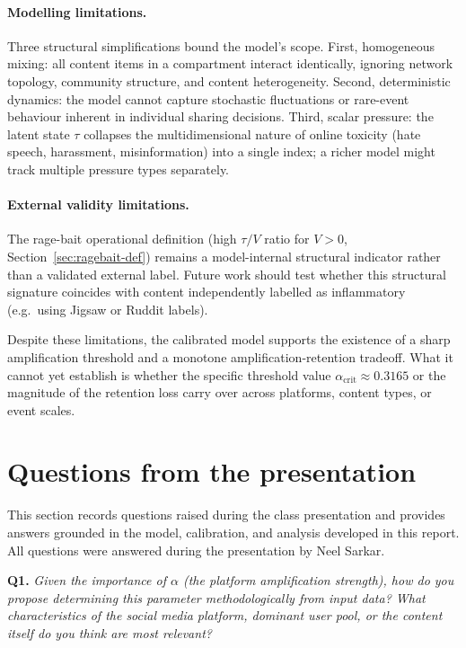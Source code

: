 \documentclass[11pt]{article}
\begin{document}
\paragraph{Modelling limitations.}
Three structural simplifications bound the model's scope. First, homogeneous mixing: all content items in a compartment interact identically, ignoring network topology, community structure, and content heterogeneity. Second, deterministic dynamics: the model cannot capture stochastic fluctuations or rare-event behaviour inherent in individual sharing decisions. Third, scalar pressure: the latent state $\tau$ collapses the multidimensional nature of online toxicity (hate speech, harassment, misinformation) into a single index; a richer model might track multiple pressure types separately.

\paragraph{External validity limitations.}
The rage-bait operational definition (high $\tau/V$ ratio for $V>0$, Section~\ref{sec:ragebait-def}) remains a model-internal structural indicator rather than a validated external label. Future work should test whether this structural signature coincides with content independently labelled as inflammatory (e.g.\ using Jigsaw or Ruddit labels).

Despite these limitations, the calibrated model supports the existence of a sharp amplification threshold and a monotone amplification-retention tradeoff. What it cannot yet establish is whether the specific threshold value $\alpha_{\mathrm{crit}} \approx 0.3165$ or the magnitude of the retention loss carry over across platforms, content types, or event scales.


\newpage
\section{Questions from the presentation}
\label{sec:questions}

This section records questions raised during the class presentation and provides answers grounded in the model, calibration, and analysis developed in this report. All questions were answered during the presentation by Neel Sarkar.

\bigskip

\noindent\textbf{Q1.} \textit{Given the importance of $\alpha$ (the platform amplification strength), how do you propose determining this parameter methodologically from input data? What characteristics of the social media platform, dominant user pool, or the content itself do you think are most relevant?}
\end{document}
